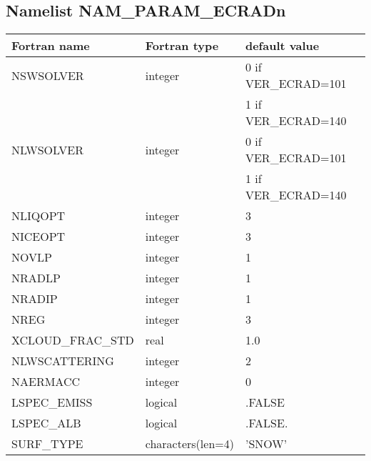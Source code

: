 \vspace{0.1cm}

\subsection{Namelist NAM\_PARAM\_ECRADn} 
\begin{longtable} {|p{}|p{}|p{}|}
\hline
Fortran name &  Fortran type & default value \\
\hline 
\endhead
\hline
\endfoot
NSWSOLVER & integer& 0 if VER\_ECRAD=101\\
 & & 1 if VER\_ECRAD=140 \\
NLWSOLVER & integer& 0 if VER\_ECRAD=101\\
 & & 1 if VER\_ECRAD=140 \\
NLIQOPT & integer&3\\
NICEOPT & integer&3 \\
NOVLP & integer& 1\\
NRADLP & integer& 1\\
NRADIP & integer&1 \\
NREG & integer& 3\\
XCLOUD\_FRAC\_STD & real &1.0\\
NLWSCATTERING & integer&2 \\
NAERMACC& integer&0 \\
LSPEC\_EMISS & logical & .FALSE \\
LSPEC\_ALB & logical & .FALSE. \\
SURF\_TYPE & characters(len=4) & 'SNOW' \\
\end{longtable}

